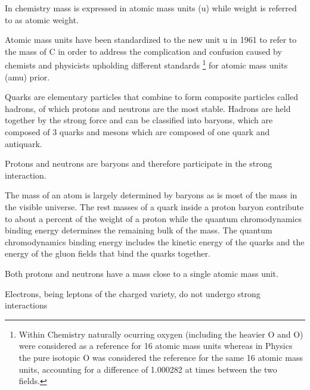 In chemistry mass is expressed in atomic mass units (\si{\atomicmassunit})
while weight is referred to as atomic weight.

Atomic mass units have been standardized to the new
unit \si{\atomicmassunit} in 1961 to refer to the mass of C in order
to address the complication and confusion caused by chemists and physicists
upholding different standards
\footnote{Within Chemistry naturally ocurring oxygen (including the heavier
O and O) were considered as a reference for 16 atomic mass
units whereas in Physics the pure isotopic O was considered the
reference for the same 16 atomic mass units, accounting for a difference of
\num{1.000282} at times between the two fields.} for atomic mass units (amu)
prior.

Quarks are elementary particles that combine to form composite particles called
hadrons, of which protons and neutrons are the most stable. Hadrons are held
together by the strong force and can be classified into baryons, which are
composed of 3 quarks and mesons which are composed of one quark and antiquark.

Protons and neutrons are baryons and therefore participate in the strong
interaction.

The mass of an atom is largely determined by baryons as is most of the mass
in the visible universe. The rest masses of a quark inside a proton baryon
contribute to about a percent of the weight of a proton while the quantum
chromodynamics binding energy determines the remaining bulk of the mass.
The quantum chromodynamics binding energy includes the kinetic energy of
the quarks and the energy of the gluon fields that bind the quarks together.

Both protons and neutrons have a mass close to a single atomic mass unit.

Electrons, being leptons of the charged variety, do
not undergo strong interactions 

